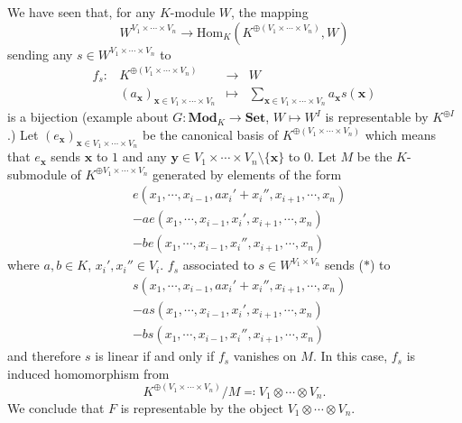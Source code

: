\begin{proofenv}
    We have seen that, for any $K$-module $W$, the mapping
    $$ W^{V_1\times \cdots \times V_n} \rightarrow \mathrm{Hom}_{K} \left(K^{\oplus (V_1\times \cdots \times V_n)}, W\right)$$
    sending any $s \in W^{V_1\times \cdots \times V_n}$ to 
    $$\begin{array}{rrcl}
        f_{s} : & K^{\oplus (V_1\times \cdots \times V_n)} & \longrightarrow & W\\
        & \left(a_{\bm{x}}\right)_{\bm{x}\in V_1\times \cdots \times V_n} & \longmapsto &\displaystyle \sum_{\bm{x}\in V_1\times \cdots \times V_n} a_{\bm{x}} s(\bm{x})
    \end{array}$$
    is a bijection (example about $G: \mathbf{Mod}_{K} \rightarrow \mathbf{Set}$, $W \mapsto W^I$ is representable by $K^{\oplus I}$.)
    Let $\left(e_{\bm{x}}\right)_{\bm{x}\in V_1 \times \cdots \times V_n}$ be the canonical basis of $K^{\oplus (V_1\times \cdots \times V_n)}$ which means that $e_{\bm{x}}$ sends $\bm{x}$ to $1$ and any $\bm{y}\in V_{1}\times \cdots \times V_n\setminus\{\bm{x}\}$ to $0$.
    Let $M$ be the $K$-submodule of $K^{\oplus V_1\times \cdots \times V_n}$ generated by elements of the form
    \begin{equation*}
        \begin{aligned}
            & e\left(x_1,\cdots,x_{i-1}, ax_i' + x_i'',x_{i+1},\cdots,x_n\right)\\
            & - a e\left(x_1,\cdots,x_{i-1}, x_i',x_{i+1},\cdots,x_n\right)\\
            & - b e\left(x_1,\cdots,x_{i-1}, x_i'',x_{i+1},\cdots,x_n\right)
        \end{aligned} \tag{$*$}
    \end{equation*}
    where $a,b\in K$, $x_i', x_i'' \in V_i$.
    $f_s$ associated to $s \in W^{V_1\times V_n}$ sends ($*$) to  
        \begin{equation*}
        \begin{aligned}
            & s\left(x_1,\cdots,x_{i-1}, ax_i' + x_i'',x_{i+1},\cdots,x_n\right)\\
            & - a s\left(x_1,\cdots,x_{i-1}, x_i',x_{i+1},\cdots,x_n\right)\\
            & - b s\left(x_1,\cdots,x_{i-1}, x_i'',x_{i+1},\cdots,x_n\right)
        \end{aligned}
    \end{equation*}
    and therefore $s$ is linear if and only if $f_s$ vanishes on $M$.
    In this case, $f_s$ is induced homomorphism from
    $$K^{\oplus (V_1\times \cdots \times V_n)}/M \eqcolon V_1\otimes \cdots \otimes V_n.$$
    We conclude that $F$ is representable by the object $V_1\otimes \cdots \otimes V_n$.
\end{proofenv}

